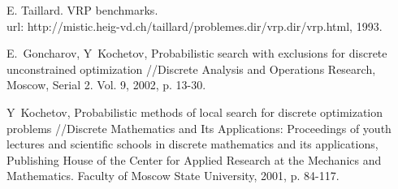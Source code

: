 \documentclass[]{TAACpaper}
\begin{document}
\begin{thebibliography}{99}
  E. Taillard. VRP benchmarks.\\ url: http://mistic.heig-vd.ch/taillard/problemes.dir/vrp.dir/vrp.html, 1993.

 E.~Goncharov, Y~Kochetov, Probabilistic search with exclusions for discrete unconstrained optimization  //Discrete Analysis and Operations Research, Moscow, Serial 2. Vol. 9, 2002, p. 13-30.

   Y~Kochetov, Probabilistic methods of local search for discrete optimization problems //Discrete Mathematics and Its Applications: Proceedings of youth lectures and scientific schools in discrete mathematics and its applications, Publishing House of the Center for Applied Research at the Mechanics and Mathematics. Faculty of Moscow State University, 2001, p. 84-117.  

\end{thebibliography}
\end{document}
